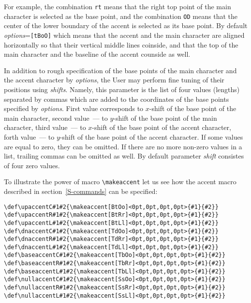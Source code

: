 For example, the combination {\tt rt} means that the right top
point of the main character is selected as the base point,
and the combination {\tt OD} means that the center of the lower
boundary of the accent is selected as its base point.
By default {\em options}={\tt [tBoO]}
which means that the accent and
the main character are aligned horizontally so that their
vertical middle lines coinside, and that the top of the main character
and the baseline of the accent counside as well.

In addition to rough specification of the base points of the main character
and the accent character by {\em options}, the User may perform fine
tuning of their positions using {\em shifts}. Namely,
this parameter is the list of four values (lengths) separated by commas
which are added to the coordinates of the base points specified by
{\em options}. First value corresponds to $x$-shift of the base point
of the main character, second value~--- to $y$-shift of the base point
of the main character, third value~--- to $x$-shift of the base point
of the accent character, forth value~--- to $y$-shift of the base point
of the accent character. If some values are equal to zero,
they can be omitted. If there are no more non-zero values in a list,
trailing commas can be omitted as well. By default parameter
{\em shift} consistes of four zero values.

To illustrate the power of macro \verb?\makeaccent? let us see how the
accent macro described in section~\ref{S-commands} can be
specified:
\begin{center}
\small
\begin{verbatim}
\def\upaccentC#1#2{\makeaccent[BtOo]<0pt,0pt,0pt,0pt>{#1}{#2}}
\def\upaccentR#1#2{\makeaccent[BtRr]<0pt,0pt,0pt,0pt>{#1}{#2}}
\def\upaccentL#1#2{\makeaccent[BtLl]<0pt,0pt,0pt,0pt>{#1}{#2}}
\def\dnaccentC#1#2{\makeaccent[TdOo]<0pt,0pt,0pt,0pt>{#1}{#2}}
\def\dnaccentR#1#2{\makeaccent[TdRr]<0pt,0pt,0pt,0pt>{#1}{#2}}
\def\dnaccentL#1#2{\makeaccent[TdLl]<0pt,0pt,0pt,0pt>{#1}{#2}}
\def\baseaccentC#1#2{\makeaccent[TbOo]<0pt,0pt,0pt,0pt>{#1}{#2}}
\def\baseaccentR#1#2{\makeaccent[TbRr]<0pt,0pt,0pt,0pt>{#1}{#2}}
\def\baseaccentL#1#2{\makeaccent[TbLl]<0pt,0pt,0pt,0pt>{#1}{#2}}
\def\nullaccentC#1#2{\makeaccent[SsOo]<0pt,0pt,0pt,0pt>{#1}{#2}}
\def\nullaccentR#1#2{\makeaccent[SsRr]<0pt,0pt,0pt,0pt>{#1}{#2}}
\def\nullaccentL#1#2{\makeaccent[SsLl]<0pt,0pt,0pt,0pt>{#1}{#2}}
\end{verbatim}
\end{center}


